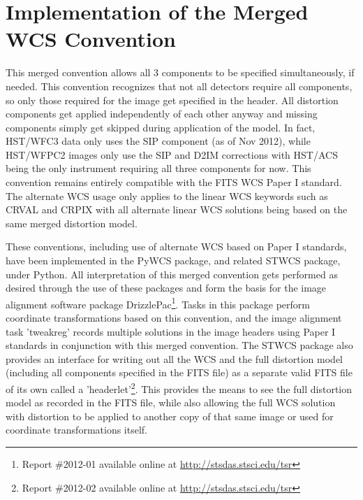 \documentclass[11pt,twoside]{article}
\begin{document}
\section{Implementation of the Merged WCS Convention}
This merged convention allows all 3 components to be specified simultaneously, if needed.  This convention recognizes that not all detectors require all components, so only those required for the image get specified in the header. All distortion components get applied independently of each other anyway and missing components simply get skipped during application of the model. In fact, HST/WFC3 data only uses the SIP component (as of Nov 2012), while HST/WFPC2 images only use the SIP and D2IM corrections with HST/ACS being the only instrument requiring all three components for now. This convention remains entirely compatible with the FITS WCS Paper I standard\citep{greisen_2002}. The alternate WCS usage only applies to the linear WCS keywords such as CRVAL and CRPIX with all alternate linear WCS solutions being based on the same merged distortion model.

These conventions, including use of alternate WCS based on Paper I standards, have been implemented in the PyWCS package, and related STWCS package, under Python. All interpretation of this merged convention gets performed as desired through the use of these packages and form the basis for the image alignment software package DrizzlePac\citep{hack_fc}\footnote{Report \#2012-01 available online at \url{http://stsdas.stsci.edu/tsr}}. Tasks in this package perform coordinate transformations based on this convention, and the image alignment task 'tweakreg' records multiple solutions in the image headers using Paper I standards in conjunction with this merged convention. The STWCS package also provides an interface for writing out all the WCS and the full distortion model (including all components specified in the FITS file) as a separate valid FITS file of its own called a 'headerlet'\citep{hack_hlet}\footnote{Report \#2012-02 available online at \url{http://stsdas.stsci.edu/tsr}}.  This provides the means to see the full distortion model as recorded in the FITS file, while also allowing the full WCS solution with distortion to be applied to another copy of that same image or used for coordinate transformations itself.
\end{document}
